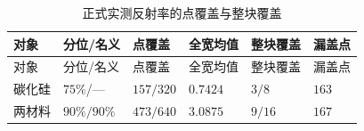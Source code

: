 \begingroup
\small
\setlength{\LTpre}{0.35em}
\setlength{\LTpost}{0.35em}
\begin{longtable}{>{\centering\arraybackslash}p{}>{\centering\arraybackslash}p{}>{\centering\arraybackslash}p{}>{\centering\arraybackslash}p{}>{\centering\arraybackslash}p{}>{\centering\arraybackslash}p{}}
\caption{正式实测反射率的点覆盖与整块覆盖}\label{tab:09}\\
\toprule
对象 & 分位/名义 & 点覆盖 & 全宽均值 & 整块覆盖 & 漏盖点\\
\midrule
\endfirsthead
\toprule
对象 & 分位/名义 & 点覆盖 & 全宽均值 & 整块覆盖 & 漏盖点\\
\midrule
\endhead
碳化硅 & $75\%$/--- & $157/320$ & $0.7424$ & $3/8$ & $163$\\
两材料 & $90\%/90\%$ & $473/640$ & $3.0875$ & $9/16$ & $167$\\
\bottomrule
\end{longtable}
